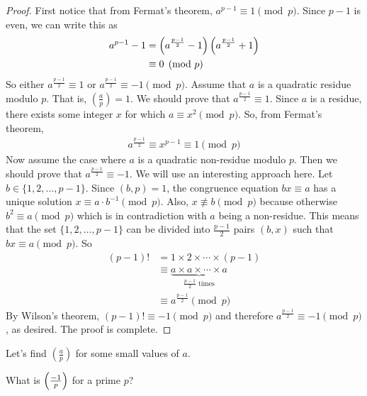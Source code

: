 \begin{proof}
	First notice that from Fermat's theorem, $a^{p-1} \equiv 1 \pmod p$. Since $p-1$ is even, we can write this as
	\begin{align*}
		a^{p-1} - 1
			& = \left(a^{\frac{p-1}{2}} - 1\right)\left(a^{\frac{p-1}{2}} + 1\right)\\
			& \equiv 0 \pmod p
	\end{align*}
	So either $a^{\frac{p-1}{2}} \equiv 1$ or $a^{\frac{p-1}{2}} \equiv -1 \pmod p$.
	Assume that $a$ is a quadratic residue modulo $p$. That is, $ \left(\frac{a}{p}\right)=1$. We should prove that $a^{\frac{p-1}{2}} \equiv 1$. Since $a$ is a residue, there exists some integer $x$ for which $a \equiv x^2 \pmod p$. So, from Fermat's theorem,
	\begin{align*}
		a^{\frac{p-1}{2}} \equiv x^{p-1} \equiv 1 \pmod p
	\end{align*}
	Now assume the case where $a$ is a quadratic non-residue modulo $p$. Then we should prove that $a^{\frac{p-1}{2}} \equiv -1$. We will use an interesting approach here. Let $b \in \{1,2,\ldots,p-1\}$. Since $(b,p)=1$, the congruence equation $bx \equiv a$ has a unique solution $x \equiv a \cdot b^{-1} \pmod p$. Also, $x \not \equiv b \pmod p$ because otherwise $b^2 \equiv a \pmod p$ which is in contradiction with $a$ being a non-residue. This means that the set $\{1,2,\ldots,p-1\}$ can be divided into $\frac{p-1}{2}$ pairs $(b,x)$ such that $bx \equiv a \pmod p$. So
	\begin{align*}
		(p-1)!
			& = 1 \times 2 \times \cdots \times (p-1)\\
			& \equiv \underbrace{a \times a \times \cdots \times a}_{\frac{p-1}{2}\text{ times}}\\
			& \equiv a^{\frac{p-1}{2}} \pmod p
	\end{align*}
	By Wilson's theorem, $(p-1)! \equiv -1 \pmod p$ and therefore $a^{\frac{p-1}{2}} \equiv -1 \pmod p$, as desired. The proof is complete.
\end{proof}
Let's find $\left(\frac{a}{p}\right)$ for some small values of $a$.
\begin{problem}
	What is $\left(\frac{-1}{p}\right)$ for a prime $p$?
\end{problem}

